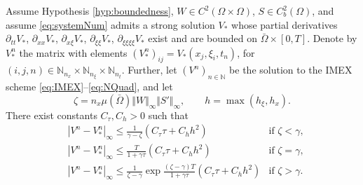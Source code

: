 \documentclass[a4paper,final]{siamart190516}
\newcommand{\Nb}{\mathbb{N}}
\begin{document}
\begin{lemma}\label{lem:IMEXconvergence}
  Assume Hypothesis \ref{hyp:boundedness}, $W \in C^2(\Omega \times \Omega)$, $S
  \in C^2_b(\Omega)$, and assume \eqref{eq:systemNum}
  admits a strong solution $V_*$ 
  whose partial derivatives $\partial_{tt}V_*$, $\partial_{xx}V_*$,
  $\partial_{x\xi}V_*$, $\partial_{\xi\xi}V_*$, $\partial_{\xi\xi\xi\xi}V_*$
  exist and are bounded on $\bar \Omega \times [0,T]$. Denote 
  by $V^n_*$ the matrix with elements $(V_*^n)_{ij} =
  V_*(x_j,\xi_i,t_n)$, for $(i,j,n) \in \Nb_{n_x} \times \Nb_{n_\xi} \times \Nb_{n_t}$. 
  Further, let $(V^n)_{n \in \Nb}$ be the solution to the IMEX scheme
  \eqref{eq:IMEX}--\eqref{eq:NQuad}, and let
  \[
    \zeta = n_x \mu(\bar\Omega) \Vert W \Vert_\infty \Vert S' \Vert_\infty, 
  \qquad
  h = \max(h_\xi, h_x).
  \]
  There exist constants $C_\tau, C_h >0$ such that
  \begin{align}
     & |V^n - V_*^n|_\infty \leq \frac{1}{\gamma -\zeta}(C_\tau \tau + C_h h^2) 
	  & \text{if $\zeta < \gamma$} \label{eq:bound1}, \\
     & |V^n - V_*^n|_\infty \leq \frac{T}{1+ \gamma \tau} (C_\tau \tau + C_h h^2)
	  & \text{if $\zeta = \gamma$} \label{eq:bound2}, \\
     & |V^n - V_*^n|_\infty \leq 
     \frac{1}{\zeta - \gamma} \exp \frac{(\zeta - \gamma) T}{1+\gamma \tau}
	   (C_\tau \tau + C_h h^2)
          & \text{if $\zeta > \gamma$} \label{eq:bound3}.
  \end{align}
\end{lemma}
\end{document}
